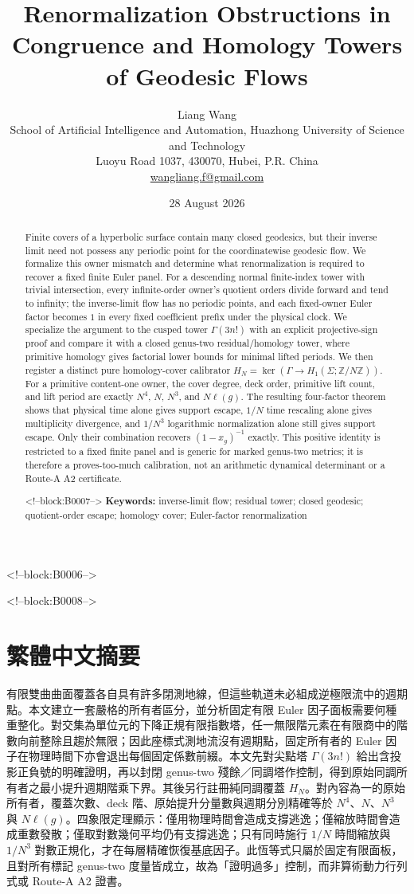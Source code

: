 \documentclass[11pt]{article}
\title{Renormalization Obstructions in Congruence and Homology Towers of Geodesic Flows}
\author{Liang Wang\\[2pt]
\small School of Artificial Intelligence and Automation, Huazhong University of Science and Technology\\
\small Luoyu Road 1037, 430070, Hubei, P.R. China\\
\small \href{mailto:wangliang.f@gmail.com}{wangliang.f@gmail.com}}
\date{28 August 2026}
\theoremstyle{definition}
\theoremstyle{remark}
\begin{document}
\maketitle

<!--block:B0006-->
\begin{abstract}
Finite covers of a hyperbolic surface contain many closed geodesics, but their inverse limit need not possess any periodic point for the coordinatewise geodesic flow. We formalize this owner mismatch and determine what renormalization is required to recover a fixed finite Euler panel. For a descending normal finite-index tower with trivial intersection, every infinite-order owner's quotient orders divide forward and tend to infinity; the inverse-limit flow has no periodic points, and each fixed-owner Euler factor becomes $1$ in every fixed coefficient prefix under the physical clock. We specialize the argument to the cusped tower $\Gamma(3n!)$ with an explicit projective-sign proof and compare it with a closed genus-two residual/homology tower, where primitive homology gives factorial lower bounds for minimal lifted periods. We then register a distinct pure homology-cover calibrator $H_N=\ker(\Gamma\to H_1(\Sigma;\mathbb Z/N\mathbb Z))$. For a primitive content-one owner, the cover degree, deck order, primitive lift count, and lift period are exactly $N^4$, $N$, $N^3$, and $N\ell(g)$. The resulting four-factor theorem shows that physical time alone gives support escape, $1/N$ time rescaling alone gives multiplicity divergence, and $1/N^3$ logarithmic normalization alone still gives support escape. Only their combination recovers $(1-x_g)^{-1}$ exactly. This positive identity is restricted to a fixed finite panel and is generic for marked genus-two metrics; it is therefore a proves-too-much calibration, not an arithmetic dynamical determinant or a Route-A A2 certificate.

<!--block:B0007-->
\medskip
\noindent\textbf{Keywords:} inverse-limit flow; residual tower; closed geodesic; quotient-order escape; homology cover; Euler-factor renormalization
\end{abstract}

<!--block:B0008-->
\section*{繁體中文摘要}
有限雙曲曲面覆蓋各自具有許多閉測地線，但這些軌道未必組成逆極限流中的週期點。本文建立一套嚴格的所有者區分，並分析固定有限 Euler 因子面板需要何種重整化。對交集為單位元的下降正規有限指數塔，任一無限階元素在有限商中的階數向前整除且趨於無限；因此座標式測地流沒有週期點，固定所有者的 Euler 因子在物理時間下亦會退出每個固定係數前綴。本文先對尖點塔 $\Gamma(3n!)$ 給出含投影正負號的明確證明，再以封閉 genus-two 殘餘／同調塔作控制，得到原始同調所有者之最小提升週期階乘下界。其後另行註冊純同調覆蓋 $H_N$。對內容為一的原始所有者，覆蓋次數、deck 階、原始提升分量數與週期分別精確等於 $N^4$、$N$、$N^3$ 與 $N\ell(g)$。四象限定理顯示：僅用物理時間會造成支撐逃逸；僅縮放時間會造成重數發散；僅取對數幾何平均仍有支撐逃逸；只有同時施行 $1/N$ 時間縮放與 $1/N^3$ 對數正規化，才在每層精確恢復基底因子。此恆等式只屬於固定有限面板，且對所有標記 genus-two 度量皆成立，故為「證明過多」控制，而非算術動力行列式或 Route-A A2 證書。
\end{document}
